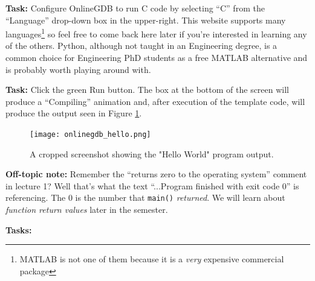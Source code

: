 \documentclass{lab}
\begin{document}
\textbf{Task:} Configure OnlineGDB to run C code by selecting ``C'' from the ``Language'' drop-down box in the upper-right. This website supports many languages\footnote{MATLAB is not one of them because it is a \textit{very} expensive commercial package} so feel free to come back here later if you're interested in learning any of the others. Python, although not taught in an Engineering degree, is a common choice for Engineering PhD students as a free MATLAB alternative and is probably worth playing around with.

\textbf{Task:} Click the green Run button. The box at the bottom of the screen will produce a ``Compiling'' animation and, after execution of the template code, will produce the output seen in Figure \ref{fig:onlinegdb_hello}.

\begin{figure}[H]
\begin{center}
\texttt{[image: onlinegdb\_hello.png]}
\end{center}
\caption{A cropped screenshot showing the "Hello World" program output.}\label{fig:onlinegdb_hello}
\end{figure}

\textbf{Off-topic note:} Remember the ``returns zero to the operating system'' comment in lecture 1? Well that's what the text ``...Program finished with exit code 0'' is referencing. The 0 is the number that \texttt{main()} \textit{returned}. We will learn about \textit{function return values} later in the semester.

\textbf{Tasks:} 
\end{document}
